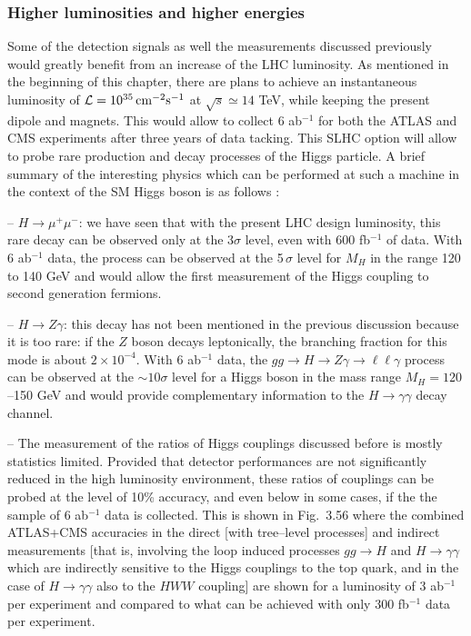 \subsubsection{Higher luminosities and higher energies}

Some of the detection signals as well the measurements discussed previously
would greatly benefit from an increase of the LHC luminosity. As mentioned in
the beginning of this chapter, there are plans to achieve an instantaneous
luminosity of ${\cal L}=10^{35}\, {\rm cm^{-2} s^{-1}}$ at $\sqrt{s} \simeq 14$
TeV, while keeping the present dipole and magnets. This would allow to collect
6 ab$^{-1}$ for both the ATLAS and CMS experiments after three years of data
tacking. This SLHC option will allow to probe rare production and decay
processes of the Higgs particle.  A brief summary of the interesting physics
which can be performed at such a machine in the context of the SM Higgs boson
is as follows \cite{SLHC,SLHC+VLHC}: \s

-- $H \to \mu^+ \mu^-$: we have seen that with the present LHC design
luminosity, this rare decay can be observed only at the $3\sigma$ level, even
with 600 fb$^{-1}$ of data. With 6 ab$^{-1}$ data, the process can be observed
at the 5\,$\sigma$ level for $M_H$ in the range 120 to 140 GeV and would allow
the first measurement of the Higgs coupling to second generation fermions.\s

-- $H\to Z\gamma$: this decay has not been mentioned in the previous 
discussion because it is too rare: if the $Z$ boson decays leptonically, 
the branching fraction for this mode is about $2 \times 10^{-4}$. 
With 6 ab$^{-1}$ data, the $gg \to H \to Z\gamma \to \ell \ell\gamma$ process 
can be observed at the $\sim 10 \sigma$ level for a Higgs boson in the mass 
range $M_H=120$--150 GeV and would provide complementary information to the
$H \to \gamma \gamma$ decay channel.\s

-- The measurement of the ratios of Higgs couplings discussed before is mostly
statistics limited. Provided that detector performances are not significantly
reduced in the high luminosity environment, these ratios of couplings can be
probed at the level of 10\% accuracy, and even below in some cases, if the
the sample of 6 ab$^{-1}$ data is collected. This is shown in Fig.~3.56 where
the combined ATLAS+CMS accuracies in the direct [with tree--level processes]
and indirect measurements [that is, involving the loop induced processes $gg 
\to H$ and $H \to \gamma \gamma$ which are indirectly sensitive to the Higgs
couplings to the top quark, and in the case of $H \to \gamma \gamma$ also to 
the $HWW$ coupling] are shown for a luminosity of 3 ab$^{-1}$ per 
experiment and compared to what can be achieved with only 300 fb$^{-1}$ 
data per experiment.\s 

